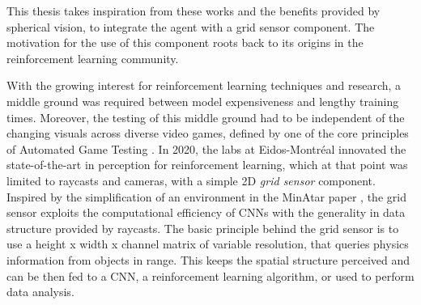 

This thesis takes inspiration from these works and the benefits provided by spherical vision, to integrate the agent with a grid sensor component.
The motivation for the use of this component roots back to its origins in the reinforcement learning community. 

With the growing interest for reinforcement learning techniques and research, a middle ground was required between model expensiveness and lengthy training times. Moreover, the testing of this middle ground had to be independent of the changing visuals across diverse video games, defined by one of the core principles of Automated Game Testing \cite{unity-eidosmontreal2020}. 
In 2020, the labs at Eidos-Montréal \cite{unity-eidosmontreal2020} innovated the state-of-the-art in perception for reinforcement learning, which at that point was limited to raycasts and cameras, with a simple 2D \textit{grid sensor} component. Inspired by the simplification of an environment in the MinAtar paper \cite{young2019minatar}, the grid sensor exploits the computational efficiency of CNNs with the generality in data structure provided by raycasts. The basic principle behind the grid sensor is to use a height x width x channel matrix of variable resolution, that queries physics information from objects in range. This keeps the spatial structure perceived and can be then fed to a CNN, a reinforcement learning algorithm, or used to perform data analysis. 



